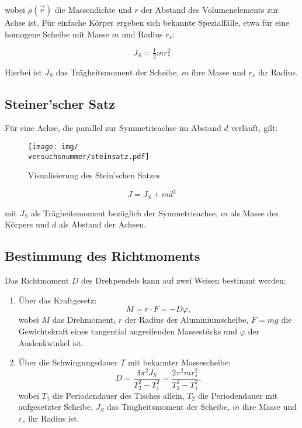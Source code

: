 wobei $\rho(\vec{r})$ die Massendichte und $r$ der Abstand des Volumenelements zur Achse ist.  
Für einfache Körper ergeben sich bekannte Spezialfälle, etwa für eine homogene Scheibe mit Masse $m$ und Radius $r_s$:

\begin{equation}
    J_S = \tfrac{1}{2} m r_s^2
\end{equation}

Hierbei ist $J_S$ das Trägheitsmoment der Scheibe, $m$ ihre Masse und $r_s$ ihr Radius.

\subsection*{Steiner’scher Satz}
Für eine Achse, die parallel zur Symmetrieachse im Abstand $d$ verläuft, gilt:

\begin{figure}[h!]
    \centering
    \texttt{[image: img/\\versuchsnummer/steinsatz.pdf]}
    \caption{Visualisierung des Stein'schen Satzes}
    \label{fig:steinscher_satz}
\end{figure}

\begin{equation}
    J = J_S + md^2
\end{equation}

mit $J_S$ als Trägheitsmoment bezüglich der Symmetrieachse, $m$ als Masse des Körpers und $d$ als Abstand der Achsen.
\subsection*{Bestimmung des Richtmoments}
Das Richtmoment $D$ des Drehpendels kann auf zwei Weisen bestimmt werden:

\begin{enumerate}
    \item Über das Kraftgesetz:
    \begin{equation}
        M = r \cdot F = -D\varphi,
    \end{equation}
    wobei $M$ das Drehmoment, $r$ der Radius der Aluminiumscheibe, $F = mg$ die Gewichtskraft eines tangential angreifenden Massestücks und $\varphi$ der Auslenkwinkel ist.
    
    \item Über die Schwingungsdauer $T$ mit bekannter Massescheibe:
    \begin{equation}
        D = \frac{4\pi^2 J_S}{T_2^2 - T_1^2} = \frac{2\pi^2 m r_s^2}{T_2^2 - T_1^2},
    \end{equation}
    wobei $T_1$ die Periodendauer des Tisches allein, $T_2$ die Periodendauer mit aufgesetzter Scheibe, $J_S$ das Trägheitsmoment der Scheibe, $m$ ihre Masse und $r_s$ ihr Radius ist.
\end{enumerate}

